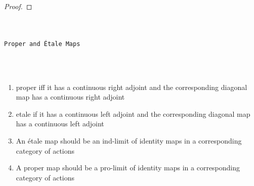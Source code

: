\documentclass{book}
\theoremstyle{definition}
\newtheorem{theorem}{Theorem}
\renewcommand{\chapter}[1]{
\newpage
{
\Huge 
\begin{center}
\ \\
\ \\
\thispagestyle{empty}
\texttt{#1}
\end{center}}
\ \\
\ \\
}
\begin{document}
\begin{proof}

\end{proof}
\fi

\chapter{Proper and Étale Maps}

\begin{enumerate}
\item proper iff it has a continuous right adjoint and the corresponding diagonal map has a continuous right adjoint
\item etale if it has a continuous left adjoint and the corresponding diagonal map has a continuous left adjoint
\item An étale map should be an ind-limit of identity maps in a corresponding category of actions
\item A proper map should be a pro-limit of identity maps in a corresponding category of actions
\end{enumerate}
\end{document}
